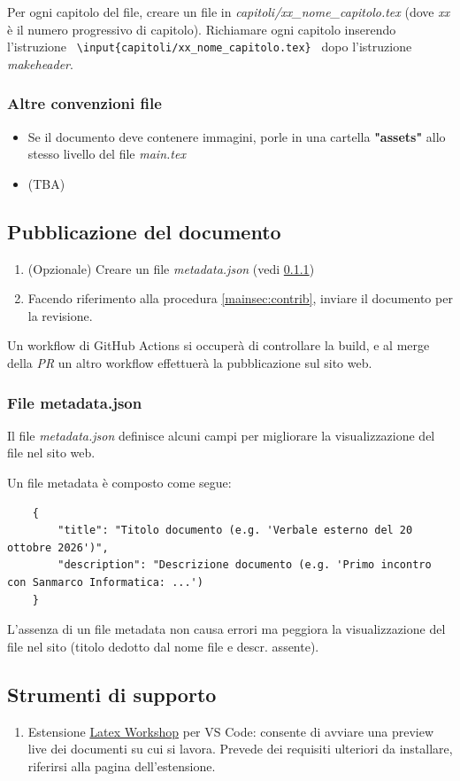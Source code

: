 Per ogni capitolo del file, creare un file in \textit{capitoli/xx\_nome\_capitolo.tex} (dove \textit{xx} è il numero progressivo di capitolo).
Richiamare ogni capitolo inserendo l'istruzione \texttt{ \textbackslash input\{capitoli/xx\_nome\_capitolo.tex\} } dopo l'istruzione \textit{makeheader}.

\subsubsection{Altre convenzioni file}
\begin{itemize}
    \item Se il documento deve contenere immagini, porle in una cartella \textbf{"assets"} allo stesso livello del file \textit{main.tex}
    \item (TBA)
\end{itemize}

\subsection{Pubblicazione del documento}
\begin{enumerate}
    \item (Opzionale) Creare un file \textit{metadata.json} (vedi \ref{docpub:metadata_json})
    \item Facendo riferimento alla procedura \ref{mainsec:contrib}, inviare il documento per la revisione.
\end{enumerate}
Un workflow di GitHub Actions si occuperà di controllare la build, e al merge della \textit{PR} un altro workflow effettuerà la pubblicazione sul sito web.


\subsubsection{File metadata.json}\label{docpub:metadata_json}
Il file \textit{metadata.json} definisce alcuni campi per migliorare la visualizzazione del file nel sito web.

Un file metadata è composto come segue:
\begin{verbatim}
    {
        "title": "Titolo documento (e.g. 'Verbale esterno del 20 ottobre 2026')",
        "description": "Descrizione documento (e.g. 'Primo incontro con Sanmarco Informatica: ...')
    }
\end{verbatim}

L'assenza di un file metadata non causa errori ma peggiora la visualizzazione del file nel sito (titolo dedotto dal nome file e descr. assente).

\subsection{Strumenti di supporto}\label{docpub_tech}

\begin{enumerate}
    \item Estensione \href{https://marketplace.visualstudio.com/items?itemName=James-Yu.latex-workshop}{Latex Workshop} per VS Code: consente di avviare una preview live dei documenti su cui si lavora. Prevede dei requisiti ulteriori da installare, riferirsi alla pagina dell'estensione.
\end{enumerate}